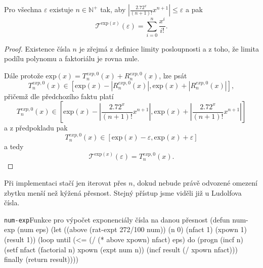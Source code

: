 \begin{consequence}
Pro všechna $\varepsilon$ existuje $n\in\mathbb{N}^+$ tak, aby $\left|\frac{2.72^x}{(n+1)!}x^{n+1}\right| \leq \varepsilon$ a pak
\begin{equation}
\mathcal{T}^{\mathrm{exp}(x)}(\varepsilon)=\sum_{i=0}^n \frac{x^i}{i!}.
\end{equation}
\begin{proof}
Existence čísla $n$ je zřejmá z definice limity posloupnosti a z toho, že limita podílu polynomu a faktoriálu je rovna nule.

Dále protože $\mathrm{exp}(x) = T^{exp, 0}_n(x)+R^{exp, 0}_n(x)$, lze psát
\begin{equation}
T^{exp, 0}_n(x) \in [\mathrm{exp}(x) - |R^{exp, 0}_n(x)|, \mathrm{exp}(x) + |R^{exp, 0}_n(x)|],
\end{equation}
přičemž dle předchozího faktu platí
\begin{equation}
T^{exp, 0}_n(x) \in [\mathrm{exp}(x) - \left| \frac{2.72^x}{(n+1)!}x^{n+1} \right|, \mathrm{exp}(x) + \left| \frac{2.72^x}{(n+1)!}x^{n+1} \right|]
\end{equation}
a z předpokladu pak
\begin{equation}
T^{exp, 0}_n(x) \in [\mathrm{exp}(x) - \varepsilon, \mathrm{exp}(x) + \varepsilon]
\end{equation}
a tedy
\begin{equation}\label{eq:tat}
\mathcal{T}^{\mathrm{exp}(x)}(\varepsilon) = T^{exp, 0}_n(x).
\end{equation}
\end{proof}
\end{consequence}

Při implementaci stačí jen iterovat přes $n$, dokud nebude právě odvozené omezení zbytku menší než kýžená přesnost. Stejný přístup jsme viděli již u Ludolfova čísla.

\begin{lispcode}{\texttt{num-exp}}{Funkce pro výpočet exponenciály čísla na danou přesnost}
(\textcolor{funkcionalni}{defun} \textcolor{pojmenovan}{num-exp} (num eps)
  (\textcolor{vedlejsi}{let} ((above (\textcolor{moje}{rat-expt} 272/100 num)) (n 0)
      (nfact 1) (xpown 1) (result 1))
    (\textcolor{funkcionalni}{loop} 
      \textcolor{obarvi}{until} (\textcolor{matematicke}{<=} (\textcolor{matematicke}{/} (\textcolor{matematicke}{*} above xpown) nfact) eps)
      \textcolor{obarvi}{do} (progn
        (\textcolor{vedlejsi}{incf} n)
        (\textcolor{vedlejsi}{setf} nfact (\textcolor{moje}{factorial} n)
          xpown (\textcolor{matematicke}{expt} num n))
        (\textcolor{vedlejsi}{incf} result (\textcolor{matematicke}{/} xpown nfact)))
      \textcolor{obarvi}{finally} (\textcolor{funkcionalni}{return} result))))
\end{lispcode}

